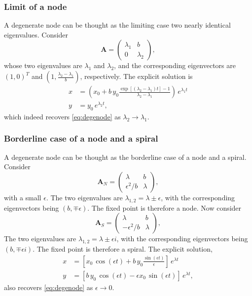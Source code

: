 \documentclass{book}
\begin{document}
\subsubsection{Limit of a node}

A degenerate node can be thought as the limiting case two nearly identical eigenvalues.  Consider
$$
\mathbf A =
\left(
  \begin{array}{cc}
    \lambda_1 & b \\
    0 & \lambda_2
  \end{array}
\right),
$$
whose two eigenvalues are $\lambda_1$ and $\lambda_2$,
and the corresponding eigenvectors are
$(1, 0)^T$ and $(1, \frac{\lambda_2 - \lambda_1}{b})$,
respectively.
The explicit solution is
$$
\begin{aligned}
  x &= \left(x_0 + b \, y_0 \frac{ \exp[(\lambda_2 - \lambda_1) t] - 1 }{\lambda_2 -\lambda_1} \right) \, e^{\lambda_1 t} \\
  y &= y_0 \, e^{\lambda_2 t},
\end{aligned}
$$
which indeed recovers \eqref{eq:degenode} as $\lambda_2 \rightarrow \lambda_1$.


\subsubsection{Borderline case of a node and a spiral}

A degenerate node can be thought as the borderline case of a node and a spiral.  Consider
$$
\mathbf A_N =
\left(
  \begin{array}{cc}
    \lambda & b \\
    \epsilon^2/b & \lambda
  \end{array}
\right),
$$
with a small $\epsilon$.
The two eigenvalues are $\lambda_{1,2} = \lambda \pm \epsilon$,
with the corresponding eigenvectors being $(b, \mp \epsilon)$.
The fixed point is therefore a node.
Now consider
$$
\mathbf A_S =
\left(
  \begin{array}{cc}
    \lambda & b \\
    -\epsilon^2/b & \lambda
  \end{array}
\right),
$$
The two eigenvalues are $\lambda_{1,2} = \lambda \pm \epsilon i$,
with the corresponding eigenvectors being $(b, \mp \epsilon i)$.
The fixed point is therefore a spiral.
The explicit solution,
$$
\begin{aligned}
  x &= \left[x_0 \, \cos(\epsilon t)+ b \, y_0 \frac{ \sin(\epsilon t) }{\epsilon} \right] \, e^{\lambda t} \\
  y &= \left[b \, y_0 \, \cos(\epsilon t) - \epsilon x_0 \, \sin(\epsilon t) \right] \, e^{\lambda t},
\end{aligned}
$$
also recovers \eqref{eq:degenode} as $\epsilon \rightarrow 0$.
\end{document}
